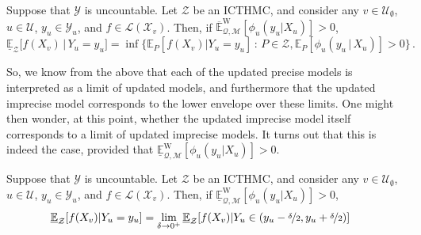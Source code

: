 \documentclass[twoside,11pt]{article}
\newcommand{\reals}{\mathbb{R}}
\newcommand{\states}{\mathcal{X}}
\newcommand{\observs}{\mathcal{Y}}
\newcommand{\lexp}{\underline{\mathbb{E}}_{\rateset,\mathcal{M}}^\mathrm{W}}
\newcommand{\uexp}{\overline{\mathbb{E}}_{\rateset,\mathcal{M}}^\mathrm{W}}
\newcommand{\gambles}{\mathcal{L}}
\newcommand{\rateset}{\mathcal{Q}}
\newcommand{\coloneqq}{:\!=}
\begin{document}
\begin{proposition}\label{prop:GBR_for_densities_lower_zero}
Suppose that $\observs$ is uncountable. Let $\mathcal{Z}$ be an ICTHMC, and consider any $v\in\mathcal{U}_\emptyset$, $u\in\mathcal{U}$, $y_u\in\observs_u$, and $f\in\gambles(\states_v)$. Then, if $\uexp[\phi_u(y_u\vert X_u)]>0$,
\begin{equation*}
\underline{\mathbb{E}}_{\mathcal{Z}}\bigl[f(X_v)\,\vert\,Y_u = y_u\bigr] = \inf\{\mathbb{E}_P[f(X_v)\vert Y_u=y_u]\,:\,P\in\mathcal{Z}, \mathbb{E}_P[\phi_u(y_u\,\vert\,X_u)]>0\}\,.
\end{equation*}
\end{proposition}
%
So, we know from the above that each of the updated precise models is interpreted as a limit of updated models, and furthermore that the updated imprecise model corresponds to the lower envelope over these limits. One might then wonder, at this point, whether the updated imprecise model itself corresponds to a limit of updated imprecise models. It turns out that this is indeed the case, provided that $\lexp[\phi_u(y_u\vert X_u)]>0$.

\begin{proposition}\label{prop:GBR_for_densities_is_limit_if_continuous}
Suppose that $\observs$ is uncountable. Let $\mathcal{Z}$ be an ICTHMC, and consider any $v\in\mathcal{U}_\emptyset$, $u\in\mathcal{U}$, $y_u\in\observs_u$, and $f\in\gambles(\states_v)$. Then, if $\lexp[\phi_u(y_u\vert X_u)]>0$,
\begin{align*}
\underline{\mathbb{E}}_\mathcal{Z}[f(X_v)\vert Y_u=y_u] %
 &= \lim_{\delta\to 0^+}\underline{\mathbb{E}}_\mathcal{Z}[f(X_v)\vert Y_u\in (y_u-\nicefrac{\delta}{2},y_u+\nicefrac{\delta}{2})]
\end{align*}
\end{proposition}
\end{document}
